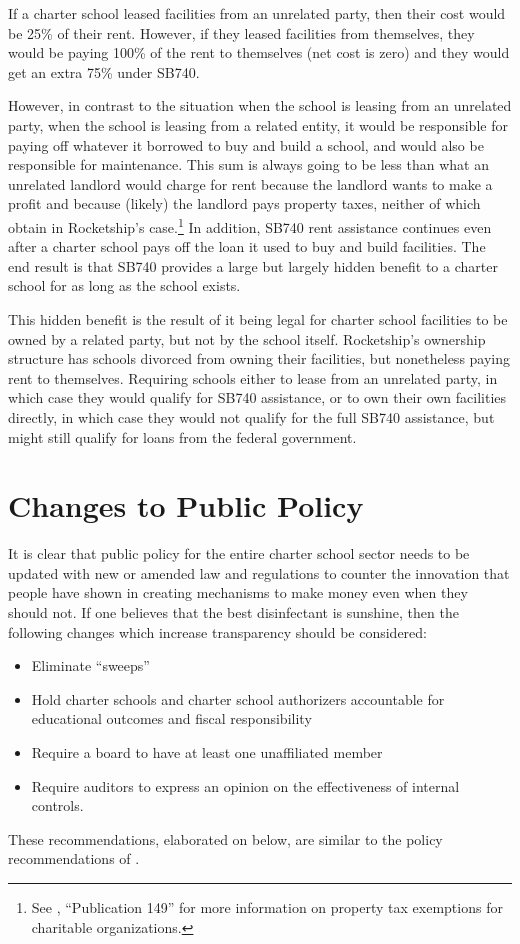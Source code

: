 If a charter school leased facilities from an unrelated party, then their cost would be 25\% of their rent. However, if they leased facilities from themselves, they would be paying 100\% of the rent to themselves (net cost is zero) and they would get an extra 75\% under SB740.

However, in contrast to the situation when the school is leasing from an unrelated party, when the school is leasing from a related entity, it would be responsible for paying off whatever it borrowed to buy and build a school, and would also be responsible for maintenance. This sum is always going to be less than what an unrelated landlord would charge for rent because the landlord wants to make a profit and because (likely) the landlord pays property taxes, neither of which obtain in Rocketship's case.\footnote{See \textcite{BOE2018a}, ``Publication 149'' for more information on property tax exemptions for charitable organizations.} In addition, SB740 rent assistance continues even after a charter school pays off the loan it used to buy and build facilities. The end result is that SB740 provides a large but largely hidden benefit to a charter school for as long as the school exists.

This hidden benefit is the result of it being legal for charter school facilities to be owned by a related party, but not by the school itself. Rocketship's ownership structure has schools divorced from owning their facilities, but nonetheless paying rent to themselves. Requiring schools either to lease from an unrelated party, in which case they would qualify for SB740 assistance, or to own their own facilities directly, in which case they would not qualify for the full SB740 assistance, but might still qualify for loans from the federal government.

\section{Changes to Public Policy}%
\label{sec:chang-publ-policy}\indent
{}

It is clear that public policy for the entire charter school sector needs to be updated with new or amended law and regulations to counter the innovation that people have shown in creating mechanisms to make money even when they should not. If one believes that the best disinfectant is sunshine, then the following changes which increase transparency should be considered:
\begin{itemize}
  \item Eliminate ``sweeps''
  \item Hold charter schools and charter school authorizers accountable for educational outcomes and fiscal responsibility
  \item Require a board to have at least one unaffiliated member
  \item Require auditors to express an opinion on the effectiveness of internal controls.
\end{itemize}
These recommendations, elaborated on below, are similar to the policy recommendations of \textcite[44–46]{Baker.Miron2015}.%

